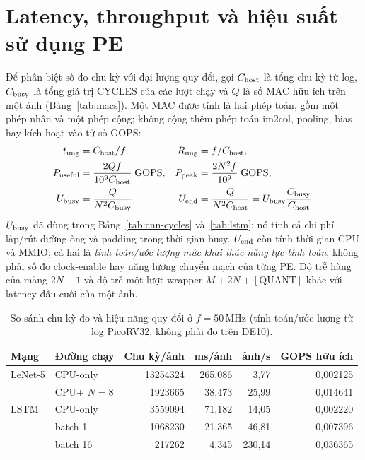 \section{Latency, throughput và hiệu suất sử dụng PE}
\label{sec:derived-metrics}
Để phân biệt số đo chu kỳ với đại lượng quy đổi, gọi $C_{\rm host}$ là tổng chu kỳ từ log, $C_{\rm busy}$ là tổng giá trị CYCLES của các lượt chạy và $Q$ là số MAC hữu ích trên một ảnh (Bảng~\ref{tab:macs}). Một MAC được tính là hai phép toán, gồm một phép nhân và một phép cộng; không cộng thêm phép toán im2col, pooling, bias hay kích hoạt vào tử số GOPS:
\begin{align}
 t_{\rm img}&=C_{\rm host}/f,& R_{\rm img}&=f/C_{\rm host},\\
 P_{\rm useful}&=\frac{2Qf}{10^9 C_{\rm host}}\;\text{GOPS},&
 P_{\rm peak}&=\frac{2N^2 f}{10^9}\;\text{GOPS},\label{eq:gops}\\
 U_{\rm busy}&=\frac{Q}{N^2 C_{\rm busy}},&
 U_{\rm end}&=\frac{Q}{N^2 C_{\rm host}}
              =U_{\rm busy}\frac{C_{\rm busy}}{C_{\rm host}}.\label{eq:utilization}
\end{align}
$U_{\rm busy}$ đã dùng trong Bảng~\ref{tab:cnn-cycles} và~\ref{tab:lstm}: nó tính cả chi phí lấp/rút đường ống và padding trong thời gian busy. $U_{\rm end}$ còn tính thời gian CPU và MMIO; cả hai là \emph{tính toán/ước lượng mức khai thác năng lực tính toán}, không phải số đo clock-enable hay năng lượng chuyển mạch của từng PE. Độ trễ hàng của mảng $2N-1$ và độ trễ một lượt wrapper $M+2N+[\mathrm{QUANT}]$ khác với latency đầu-cuối của một ảnh.

\begin{table}[H]
\centering\small
\caption{So sánh chu kỳ đo và hiệu năng quy đổi ở $f=50$\,MHz (tính toán/ước lượng từ log PicoRV32, không phải đo trên DE10).}
\label{tab:derived-performance}
\setlength{\tabcolsep}{3pt}
\begin{tabular}{llrrrr}
\toprule
Mạng & Đường chạy & Chu kỳ/ảnh & ms/ảnh & ảnh/s & GOPS hữu ích\\
\midrule
LeNet-5 & CPU-only & \num{13254324} & 265,086 & 3,77 & 0,002125\\
 & CPU+\NPU{} $N=8$ & \num{1923665} & 38,473 & 25,99 & 0,014641\\
LSTM & CPU-only & \num{3559094} & 71,182 & 14,05 & 0,002220\\
 & \NPU{} batch 1 & \num{1068230} & 21,365 & 46,81 & 0,007396\\
 & \NPU{} batch 16 & \num{217262} & 4,345 & 230,14 & 0,036365\\
\bottomrule
\end{tabular}
\end{table}

